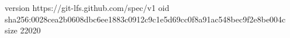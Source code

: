 version https://git-lfs.github.com/spec/v1
oid sha256:0028cea2b0608dbc6ee1883c0912c9c1e5d69cc0f8a91ac548bec9f2e8be004c
size 22020
